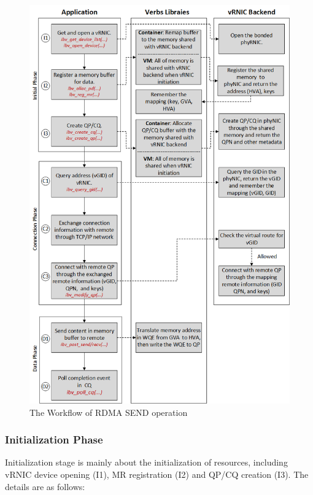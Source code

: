 \begin{figure}[!ht]
	\centering
	\includegraphics[width=1\linewidth]{images/RDMA-path.png}
	\caption{The Workflow of RDMA SEND operation}
	\label{fig:route-config}
\end{figure}

\subsubsection{Initialization Phase}
Initialization stage is mainly about the initialization of resources, including vRNIC device opening (I1), MR registration (I2) and QP/CQ creation (I3). The details are as follows:

